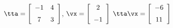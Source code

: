{$\tta =   \left[ \begin {array}{cc} -1&4\\\noalign{\medskip}7&3\end {array}
 \right] $,\quad  
$\vx = \left[ \begin {array}{c} 2\\\noalign{\medskip}-1\end {array} \right]$}
{$\tta\vx= \left[ \begin {array}{c} -6\\\noalign{\medskip}11\end {array}
\right]$
}
 

 
  



  

  


  

  

 

